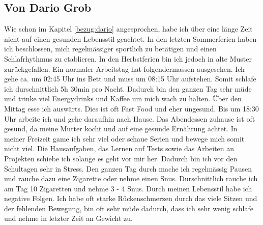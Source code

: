 \subsection{Von Dario Grob}
\authortoc{\dario}{\subsectionident}
Wie schon im Kapitel \ref{bezug:dario} angesprochen, habe ich über eine länge Zeit nicht auf einen gesunden Lebensstil geachtet. In den letzten Sommerferien haben ich beschlossen, mich regelmässiger sportlich zu betätigen und einen Schlafrhythmus zu etablieren. 
\newline
In den Herbstferien bin ich jedoch in alte Muster zurückgefallen. Ein normaler Arbeitstag hat folgendermassen ausgesehen.
\newline
Ich gehe ca. um 02:45 Uhr ins Bett und muss um 08:15 Uhr aufstehen. Somit schlafe ich durschnittlich 5h 30min pro Nacht. Dadurch bin den ganzen Tag sehr müde und trinke viel Energydrinks und Kaffee um mich wach zu halten. 
\newline
Über den Mittag esse ich auswärts. Dies ist oft Fast Food und eher ungesund.
\newline
Bis um 18:30 Uhr arbeite ich und gehe daraufhin nach Hause. Das Abendessen zuhause ist oft gesund, da meine Mutter kocht und auf eine gesunde Ernährung achtet. 
\newline
In meiner Freizeit game ich sehr viel oder schaue Serien und bewege mich somit nicht viel. 
\newline
Die Hausaufgaben, das Lernen auf Tests sowie das Arbeiten an Projekten schiebe ich solange es geht vor mir her. Dadurch bin ich vor den Schultagen sehr in Stress.
\newline
Den ganzen Tag durch mache ich regelmässig Pausen und rauche dazu eine Zigarette oder nehme einen Snus. Durschnittlich rauche ich am Tag 10 Zigaretten und nehme 3 - 4 Snus.
\newline
Durch meinen Lebensstil habe ich negative Folgen. Ich habe oft starke Rückenschmerzen durch das viele Sitzen und der fehlenden Bewegung, bin oft sehr müde dadurch, dass ich sehr wenig schlafe und nehme in letzter Zeit an Gewicht zu.
